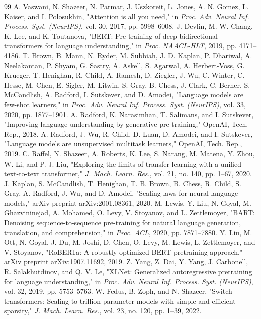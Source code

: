 \documentclass[journal]{IEEEtran}
\begin{document}
\begin{thebibliography}{99}
A. Vaswani, N. Shazeer, N. Parmar, J. Uszkoreit, L. Jones, A. N. Gomez, L. Kaiser, and I. Polosukhin, "Attention is all you need," in \textit{Proc. Adv. Neural Inf. Process. Syst. (NeurIPS)}, vol. 30, 2017, pp. 5998–6008.
J. Devlin, M. W. Chang, K. Lee, and K. Toutanova, "BERT: Pre-training of deep bidirectional transformers for language understanding," in \textit{Proc. NAACL-HLT}, 2019, pp. 4171–4186.
T. Brown, B. Mann, N. Ryder, M. Subbiah, J. D. Kaplan, P. Dhariwal, A. Neelakantan, P. Shyam, G. Sastry, A. Askell, S. Agarwal, A. Herbert-Voss, G. Krueger, T. Henighan, R. Child, A. Ramesh, D. Ziegler, J. Wu, C. Winter, C. Hesse, M. Chen, E. Sigler, M. Litwin, S. Gray, B. Chess, J. Clark, C. Berner, S. McCandlish, A. Radford, I. Sutskever, and D. Amodei, "Language models are few-shot learners," in \textit{Proc. Adv. Neural Inf. Process. Syst. (NeurIPS)}, vol. 33, 2020, pp. 1877–1901.
A. Radford, K. Narasimhan, T. Salimans, and I. Sutskever, "Improving language understanding by generative pre-training," OpenAI, Tech. Rep., 2018.
A. Radford, J. Wu, R. Child, D. Luan, D. Amodei, and I. Sutskever, "Language models are unsupervised multitask learners," OpenAI, Tech. Rep., 2019.
C. Raffel, N. Shazeer, A. Roberts, K. Lee, S. Narang, M. Matena, Y. Zhou, W. Li, and P. J. Liu, "Exploring the limits of transfer learning with a unified text-to-text transformer," \textit{J. Mach. Learn. Res.}, vol. 21, no. 140, pp. 1–67, 2020.
J. Kaplan, S. McCandlish, T. Henighan, T. B. Brown, B. Chess, R. Child, S. Gray, A. Radford, J. Wu, and D. Amodei, "Scaling laws for neural language models," arXiv preprint arXiv:2001.08361, 2020.
M. Lewis, Y. Liu, N. Goyal, M. Ghazvininejad, A. Mohamed, O. Levy, V. Stoyanov, and L. Zettlemoyer, "BART: Denoising sequence-to-sequence pre-training for natural language generation, translation, and comprehension," in \textit{Proc. ACL}, 2020, pp. 7871–7880.
Y. Liu, M. Ott, N. Goyal, J. Du, M. Joshi, D. Chen, O. Levy, M. Lewis, L. Zettlemoyer, and V. Stoyanov, "RoBERTa: A robustly optimized BERT pretraining approach," arXiv preprint arXiv:1907.11692, 2019.
Z. Yang, Z. Dai, Y. Yang, J. Carbonell, R. Salakhutdinov, and Q. V. Le, "XLNet: Generalized autoregressive pretraining for language understanding," in \textit{Proc. Adv. Neural Inf. Process. Syst. (NeurIPS)}, vol. 32, 2019, pp. 5753–5763.
W. Fedus, B. Zoph, and N. Shazeer, "Switch transformers: Scaling to trillion parameter models with simple and efficient sparsity," \textit{J. Mach. Learn. Res.}, vol. 23, no. 120, pp. 1–39, 2022.

\end{thebibliography}
\end{document}
